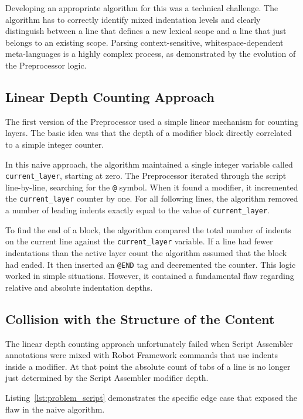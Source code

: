 Developing an appropriate algorithm for this was a technical challenge. The algorithm has to correctly identify mixed indentation levels and clearly distinguish between a line that defines a new lexical scope and a line that just belongs to an existing scope. Parsing context-sensitive, whitespace-dependent meta-languages is a highly complex process, as demonstrated by the evolution of the Preprocessor logic.


\subsection{Linear Depth Counting Approach}


The first version of the Preprocessor used a simple linear mechanism for counting layers. The basic idea was that the depth of a modifier block directly correlated to a simple integer counter. 


In this naive approach, the algorithm maintained a single integer variable called \texttt{current\_layer}, starting at zero. The Preprocessor iterated through the script line-by-line, searching for the \texttt{@} symbol. When it found a modifier, it incremented the \texttt{current\_layer} counter by one. For all following lines, the algorithm removed a number of leading indents exactly equal to the value of \texttt{current\_layer}.


To find the end of a block, the algorithm compared the total number of indents on the current line against the \texttt{current\_layer} variable. If a line had fewer indentations than the active layer count the algorithm assumed that the block had ended. It then inserted an \texttt{@END} tag and decremented the counter. This logic worked in simple situations. However, it contained a fundamental flaw regarding relative and absolute indentation depths.


\subsection{Collision with the Structure of the Content}


The linear depth counting approach unfortunately failed when Script Assembler annotations were mixed with Robot Framework commands that use indents inside a modifier. At that point the absolute count of tabs of a line is no longer just determined by the Script Assembler modifier depth.

Listing~\ref{lst:problem_script} demonstrates the specific edge case that exposed the flaw in the naive algorithm.


